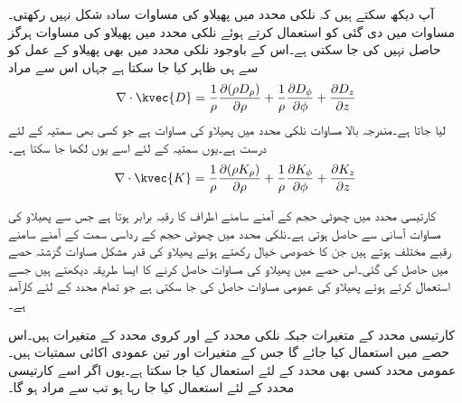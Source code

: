 آپ دیکھ سکتے ہیں کہ نلکی محدد میں پھیلاو کی مساوات سادہ شکل نہیں رکھتی۔مساوات  میں دی گئی  کو استعمال کرتے ہوئے نلکی محدد میں پھیلاو کی مساوات ہرگز حاصل نہیں کی جا سکتی ہے۔اس کے باوجود نلکی محدد میں بھی پھیلاو کے عمل کو  سے ہی ظاہر کیا جا سکتا ہے جہاں اس سے مراد
\begin{align}\label{مساوات_گاوس_نلکی_پھیلاو}
\nabla \cdot \kvec{D}=\frac{1}{\rho}\frac{\partial (\rho D_{\rho})}{\partial \rho}+\frac{1}{\rho}\frac{\partial D_{\phi}}{\partial \phi}  +  \frac{\partial D_{z}}{\partial z}
\end{align}
لیا جاتا ہے۔مندرجہ بالا مساوات نلکی محدد میں پھیلاو کی مساوات ہے جو کسی بھی سمتیہ کے لئے درست ہے۔یوں سمتیہ  کے لئے اسے یوں لکھا جا سکتا ہے۔
 \begin{align}\label{مساوات_گاوس_نلکی_عمومی_پھیلاو}
\nabla \cdot \kvec{K}=\frac{1}{\rho}\frac{\partial (\rho K_{\rho})}{\partial \rho}+\frac{1}{\rho}\frac{\partial K_{\phi}}{\partial \phi}  +  \frac{\partial K_{z}}{\partial z}
\end{align}


کارتیسی محدد میں چھوٹی حجم کے آمنے سامنے اطراف کا رقبہ برابر ہوتا ہے جس سے پھیلاو کی مساوات آسانی سے حاصل ہوتی ہے۔نلکی محدد میں چھوٹی حجم کے رداسی سمت کے آمنے سامنے رقبے مختلف ہوتے ہیں جن کا خصوصی خیال رکھتے ہوئے پھیلاو کی قدر مشکل مساوات گزشتہ حصے میں حاصل کی گئی۔اس حصے میں پھیلاو کی مساوات حاصل کرنے کا ایسا طریقہ دیکھتے ہیں جسے استعمال کرتے ہوئے پھیلاو کی عمومی مساوات حاصل کی جا سکتی ہے جو تمام محدد کے لئے کارآمد ہے۔

کارتیسی محدد کے متغیرات  جبکہ نلکی محدد کے   اور کروی محدد  کے متغیرات  ہیں۔اس حصے میں   استعمال کیا جائے گا جس کے متغیرات   اور  تین عمودی اکائی سمتیات  ہیں۔عمومی محدد کسی بھی محدد کے لئے استعمال کیا جا سکتا ہے۔یوں اگر اسے کارتیسی محدد کے لئے استعمال کیا جا رہا ہو تب   سے مراد  ہو گا۔
 
